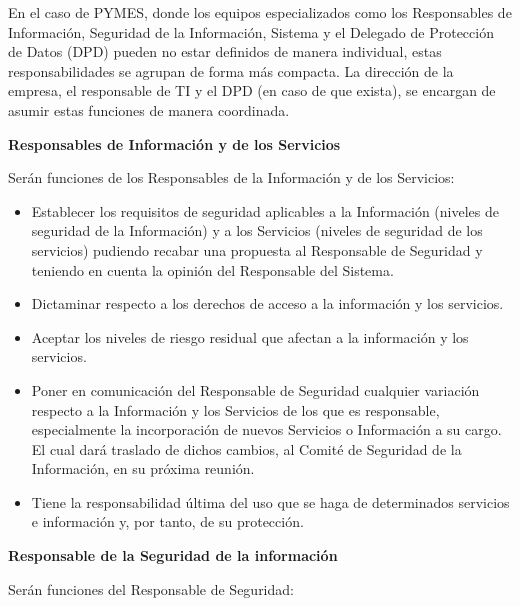 \begin{enumerate}[label=\alph*)]
\vspace{1em}

En el caso de PYMES, donde los equipos especializados como los Responsables de Informaci\'on, Seguridad de la Informaci\'on, Sistema y el Delegado de Protecci\'on de Datos (DPD) pueden no estar definidos de manera individual, estas responsabilidades se agrupan de forma m\'as compacta. La direcci\'on de la empresa, el responsable de TI y el DPD (en caso de que exista), se encargan de asumir estas funciones de manera coordinada.

\textbf{Responsables de Informaci\'on y de los Servicios}

Ser\'an funciones de los Responsables de la Informaci\'on y de los Servicios:

\begin{itemize}
  \item Establecer los requisitos de seguridad aplicables a la Informaci\'on (niveles de seguridad de la Informaci\'on) y a los Servicios (niveles de seguridad de los servicios) pudiendo recabar una propuesta al Responsable de Seguridad y teniendo en cuenta la opini\'on del Responsable del Sistema.
  \item Dictaminar respecto a los derechos de acceso a la informaci\'on y los servicios.
  \item Aceptar los niveles de riesgo residual que afectan a la informaci\'on y los servicios.
  \item Poner en comunicaci\'on del Responsable de Seguridad cualquier variaci\'on respecto a la Informaci\'on y los Servicios de los que es responsable, especialmente la incorporaci\'on de nuevos Servicios o Informaci\'on a su cargo. El cual dar\'a traslado de dichos cambios, al Comit\'e de Seguridad de la Informaci\'on, en su pr\'oxima reuni\'on.
  \item Tiene la responsabilidad \'{u}ltima del uso que se haga de determinados servicios e informaci\'on y, por tanto, de su protecci\'on.
\end{itemize}

\textbf{Responsable de la Seguridad de la informaci\'on}

Ser\'an funciones del Responsable de Seguridad:


\end{enumerate}

